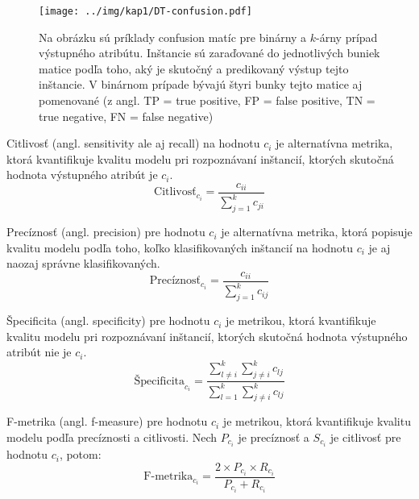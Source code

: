 \begin{figure}[h]
\centering
\centerline{\mbox{\texttt{[image: ../img/kap1/DT-confusion.pdf]}}}
\caption{Na obrázku sú príklady confusion matíc pre binárny a $k$-árny prípad výstupného atribútu. Inštancie sú zaraďované do jednotlivých buniek matice podľa toho, aký je skutočný a predikovaný výstup tejto inštancie. V binárnom prípade bývajú štyri bunky tejto matice aj pomenované (z angl. TP = true positive, FP = false positive, TN = true negative, FN = false negative)}\label{fig:Confusion}
\end{figure}

\begin{def-sk}\label{kap1:2.6:2.6.2:Sensitivity}
Citlivosť (angl. sensitivity ale aj recall) na hodnotu $c_{i}$ je alternatívna metrika, ktorá kvantifikuje kvalitu modelu pri rozpoznávaní inštancií, ktorých skutočná hodnota výstupného atribút je $c_{i}$.
\begin{equation}
\mbox{Citlivosť}_{c_{i}} = \dfrac{c_{ii}}{\sum_{j=1}^{k} c_{ji}} \nonumber
\end{equation}
\end{def-sk}

\begin{def-sk}\label{kap1:2.6:2.6.2:Sensitivity}
Precíznosť (angl. precision) pre hodnotu $c_{i}$ je alternatívna metrika, ktorá popisuje kvalitu modelu podľa toho, koľko klasifikovaných inštancií na hodnotu $c_{i}$ je aj naozaj správne klasifikovaných.
\begin{equation}
\mbox{Precíznosť}_{c_{i}} = \dfrac{c_{ii}}{\sum_{j=1}^{k} c_{ij}} \nonumber
\end{equation}
\end{def-sk}

\begin{def-sk}\label{kap1:2.6:2.6.2:Specificity}
Špecificita (angl. specificity) pre hodnotu $c_{i}$ je metrikou, ktorá kvantifikuje kvalitu modelu pri rozpoznávaní inštancií, ktorých skutočná hodnota výstupného atribút nie je $c_{i}$.
\begin{equation}
\mbox{Špecificita}_{c_{i}} = \dfrac{\sum_{l \ne i}^{k}\sum_{j \ne i}^{k} c_{lj}}{\sum_{l = 1}^{k}\sum_{j \ne i}^{k} c_{lj}} \nonumber
\end{equation}
\end{def-sk}

\begin{def-sk}[F-metrika]\label{kap1:2.6:2.6.2:Specificity}
F-metrika (angl. f-measure) pre hodnotu $c_{i}$ je metrikou, ktorá kvantifikuje kvalitu modelu podľa precíznosti a citlivosti. Nech $P_{c_{i}}$ je precíznosť a $S_{c_{i}}$ je citlivosť pre hodnotu $c_{i}$, potom:
\begin{equation}
\mbox{F-metrika}_{c_{i}} = \dfrac{2 \times P_{c_{i}} \times R_{c_{i}}}{P_{c_{i}} + R_{c_{i}}} \nonumber
\end{equation}
\end{def-sk}

